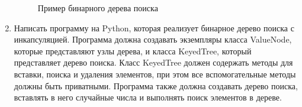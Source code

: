 \begin{enumerate}
\begin{figure}[h]
\centering
{}
\caption{Пример бинарного дерева поиска}
\end{figure}

\item Написать программу на Python, которая реализует бинарное дерево поиска с инкапсуляцией. Программа должна создавать экземпляры класса ValueNode, которые представляют узлы дерева, и класса KeyedTree, который представляет дерево поиска. Класс KeyedTree должен содержать методы для вставки, поиска и удаления элементов, при этом все вспомогательные методы должны быть приватными. Программа также должна создавать дерево поиска, вставлять в него случайные числа и выполнять поиск элементов в дереве.


\end{enumerate}
